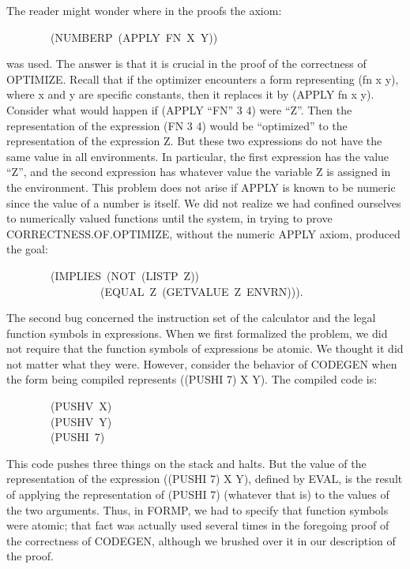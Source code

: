 \documentclass[10pt]{book}
\newenvironment{pubasis}{\begin{flushleft}}{\end{flushleft}}
\begin{document}
The reader might wonder where in the proofs the axiom:
\begin{pubasis}
~~~~~~~~(NUMBERP~(APPLY~FN~X~Y))\\
\end{pubasis}
was used.  The answer is that it is crucial in 
the proof of the correctness of OPTIMIZE.
Recall that if the optimizer encounters a form representing (fn x y),
where x and y are specific constants, then it replaces it by (APPLY fn x y).
Consider what would happen if (APPLY ``FN'' 3 4) were ``Z''.  Then the representation
of the
expression (FN 3 4) would be ``optimized'' to the representation of the expression Z.  But these
two expressions do not have the same value in all environments.
In particular, the first expression has the value ``Z'', and the second
expression has whatever value the variable Z is assigned in the environment.
This problem does not arise if APPLY is known to be numeric
since the value of a number is itself.
We did not realize we had confined ourselves to numerically valued functions
until the system, in trying to prove CORRECTNESS.OF.OPTIMIZE, without the
numeric APPLY axiom, produced
the goal:
\begin{pubasis}
~~~~~~~~(IMPLIES~(NOT~(LISTP~Z))\\
~~~~~~~~~~~~~~~~~(EQUAL~Z~(GETVALUE~Z~ENVRN))).\\
\end{pubasis}
The second bug concerned the instruction set of the calculator and the
legal function symbols in expressions.  When we first formalized the
problem, we did not require that the function symbols of expressions
be atomic.  We thought it did not matter what they were.  However,
consider the behavior of CODEGEN when the form
being compiled represents ((PUSHI 7) X Y).  The
compiled code is:
\begin{pubasis}
~~~~~~~~(PUSHV~X)\\
~~~~~~~~(PUSHV~Y)\\
~~~~~~~~(PUSHI~7)\\
\end{pubasis}
This code   pushes three things on the stack and halts.
But the value of the representation of the expression
((PUSHI 7) X Y), defined by EVAL, is  
the result of applying the representation of (PUSHI 7) (whatever that is) to the values of the two arguments.
Thus, in FORMP, we had to specify that function symbols
were atomic; that fact was actually used several times in the
foregoing proof of the
correctness of CODEGEN, although we brushed over it in our
description of the proof.
\end{document}
